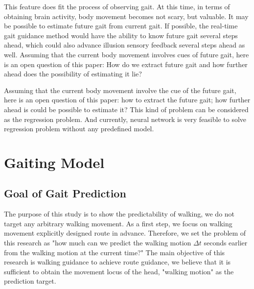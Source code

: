 \documentclass{sigchi}
\begin{document}
 This feature does fit the process of observing gait. At this time, in terms of obtaining brain activity, body movement becomes not scary, but valuable. It may be possible to estimate future gait from current gait. If possible, the real-time gait guidance method would have the ability to know future gait several steps ahead, which could also advance illusion sensory feedback several steps ahead as well. 
Assuming that the current body movement involves cues of future gait, here is an open question of this paper: How do we extract future gait and how further ahead does the possibility of estimating it lie?

Assuming that the current body movement involve the cue of the future gait, here is an open question of this paper: how to extract the future gait; how further ahead is could be possible to estimate it? This kind of problem can be considered as the regression problem. And currently, neural network\cite{LIU1999391} is very feasible to solve regression problem without any predefined model.




\section{Gaiting Model}

\subsection{Goal of Gait Prediction} %

The purpose of this study is to show the predictability of walking, we do not target any arbitrary walking movement. As a first step, we focus on walking movement explicitly designed route in advance. Therefore, we set the problem of this research as "how much can we predict the walking motion $\Delta t$ seconds earlier from the walking motion at the current time?" The main objective of this research is walking guidance to achieve route guidance, we believe that it is sufficient to obtain the movement locus of the head, "walking motion" as the prediction target.
\end{document}
